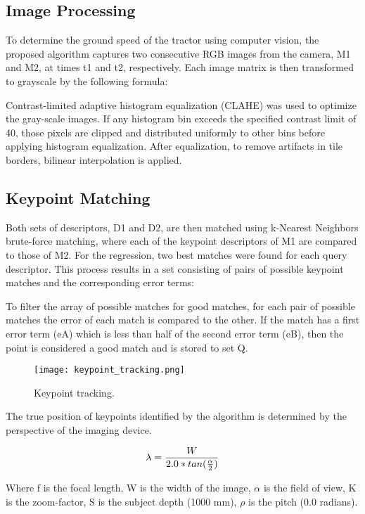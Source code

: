 \subsection{Image Processing}
To determine the ground speed of the tractor using computer vision,
the proposed algorithm captures two consecutive RGB images from the
camera, M1 and M2, at times t1 and t2, respectively. Each image matrix
is then transformed to grayscale by the following formula:

Contrast-limited adaptive histogram equalization (CLAHE) was used to
optimize the gray-scale images. If any histogram bin exceeds the
specified contrast limit of 40, those pixels are clipped and
distributed uniformly to other bins before applying histogram
equalization. After equalization, to remove artifacts in tile borders,
bilinear interpolation is applied.

\subsection{Keypoint Matching}
Both sets of descriptors, D1 and D2, are then matched using k-Nearest
Neighbors brute-force matching, where each of the keypoint descriptors
of M1 are compared to those of M2. For the regression, two best
matches were found for each query descriptor. This process results in
a set consisting of pairs of possible keypoint matches and the
corresponding error terms:

To filter the array of possible matches for good matches, for each
pair of possible matches the error of each match is compared to the
other. If the match has a first error term (eA) which is less than
half of the second error term (eB), then the point is considered a
good match and is stored to set Q.  

\begin{figure}
  \centering
  \texttt{[image: keypoint\_tracking.png]}
  \caption{Keypoint tracking.}
  \label{fig:keypoint_tracking}
\end{figure}

The true position of keypoints identified by the algorithm is
determined by the perspective of the imaging device. 

\begin{equation}
\centering
\lambda = \frac{W}{2.0 * tan(\frac{\alpha}{2})}
\label{eq:geometric}
\end{equation}
\begin{flushleft}
Where f is the focal length, W is the width of the image, $\alpha$ is
the field of view, K is the zoom-factor, S is the subject depth  (1000
mm), $\rho$ is the pitch
(0.0 radians).
\end{flushleft}

